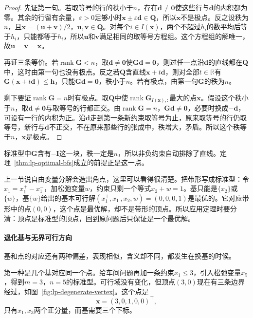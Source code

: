 \begin{proof}
 先证第一句。若取等号的行的秩小于$n$，存在$\bm{d}\neq\bm{0}$使这些行与$\bm{d}$的内积都为零。其余的行留有余量，$\varepsilon>0$足够小时$\bm{x}\pm\varepsilon\bm{d}\in\bm{Q}$，所以$\bm{x}$不是极点。反之设秩为$n$，且$\bm{x}=(\bm{u}+\bm{v})/2$，$\bm{u},\bm{v}\in\bm{Q}$。对每个$i\in I(\bm{x})$，两个不超过$h_i$的数平均后等于$h_i$，只能都等于$h_i$，所以$\bm{u}$和$\bm{v}$满足相同的取等号方程组。这个方程组的解唯一，故$\bm{u}=\bm{v}=\bm{x}$。

 再证三条等价。若$\operatorname{rank}\bm{G}<n$，取$\bm{d}\neq\bm{0}$使$\bm{G}\bm{d}=\bm{0}$，则过任一点沿$\bm{d}$的直线都在$\bm{Q}$中，这时由第一句也没有极点。反之若$\bm{Q}$含直线$\bm{x}+t\bm{d}$，则对全部$t\in\mathbb{R}$有$\bm{G}(\bm{x}+t\bm{d})\leq\bm{h}$，只能$\bm{G}\bm{d}=\bm{0}$，秩小于$n$。若有极点，由第一句$\bm{G}$的秩为$n$。

 剩下要证$\operatorname{rank}\bm{G}=n$时有极点。取$\bm{Q}$中使$\operatorname{rank}\bm{G}_{I(\bm{x}),:}$最大的点$\bm{x}$。假设这个秩小于$n$，取$\bm{d}\neq\bm{0}$与取等号的行都正交。由$\operatorname{rank}\bm{G}=n$，$\bm{G}\bm{d}\neq\bm{0}$，必要时换成$-\bm{d}$，可设有一行的内积为正。沿$\bm{d}$走到第一条新约束取等号为止，原来取等号的行仍取等号，新行与$\bm{d}$不正交，不在原来那些行的张成中，秩增大，矛盾。所以这个秩等于$n$，$\bm{x}$是极点。
\end{proof}

标准型中$\bm{G}$含有$-\bm{I}$这一块，秩一定是$n$，所以非负约束自动排除了直线。定理~\ref{thm:lp-optimal-bfs}成立的前提正是这一点。

上一节说自由变量分解会造出角点，这里可以看得很清楚。把带形写成标准型：令$x_1=x_1^{+}-x_1^{-}$，加松弛变量$w$，约束只剩一个等式$x_2+w=1$。基只能是$\{x_2\}$或$\{w\}$，基$\{w\}$给出的基本可行解$(x_1^{+},x_1^{-},x_2,w)=(0,0,0,1)$是最优的。它对应带形中的点$(0,0)$，这个点是最优解，却不是带形的顶点。所以应用定理时要分清：顶点是标准型的顶点，回到原问题后只保证是一个最优解。

\paragraph{退化基与无界可行方向}
基和点的对应还有两种偏差，表现相似，含义却不同，都发生在换基的时候。

第一种是几个基对应同一个点。给车间问题再加一条约束$x_1\leq3$，引入松弛变量$x_5$，得到$m=3$，$n=5$的标准型。可行域没有变化，但顶点$(3,0)$现在有三条边界经过，如图~\ref{fig:lp-degenerate-vertex}。这个点是
\[
 \bm{x}=(3,0,1,0,0)^\top,
\]
只有$x_1,x_3$两个正分量，而基需要三个下标。

